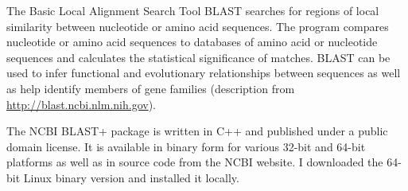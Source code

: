 The Basic Local Alignment Search Tool BLAST \citep{altschul1990} searches for
regions of local similarity between nucleotide or amino acid sequences. The
program compares nucleotide or amino acid sequences to databases of amino acid
or nucleotide sequences and calculates the statistical significance of matches.
BLAST can be used to infer functional and evolutionary relationships between
sequences as well as help identify members of gene families (description from
\url{http://blast.ncbi.nlm.nih.gov}).

The NCBI BLAST+ package is written in C++ and published under a public domain
license. It is available in binary form for various 32-bit and 64-bit platforms
as well as in source code from the NCBI website. I downloaded the 64-bit Linux binary version
and installed it locally.
